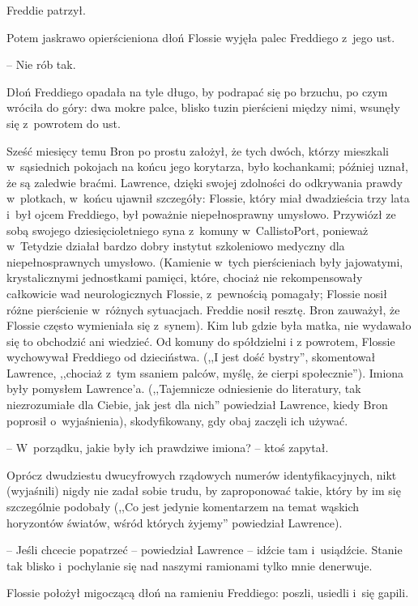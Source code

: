 \documentclass[oneside,polish,11pt,rmheadings]{mwbk}
\begin{document}
Freddie patrzył. 

Potem jaskrawo opierścieniona dłoń Flossie wyjęła palec Freddiego z~jego ust.  

-- Nie rób tak. 

Dłoń Freddiego opadała na tyle długo, by podrapać się po brzuchu, po czym wróciła do góry: dwa mokre palce, blisko tuzin pierścieni między nimi, wsunęły się z~powrotem do ust. 

Sześć miesięcy temu Bron po prostu założył, że tych dwóch, którzy mieszkali w~sąsiednich pokojach na końcu jego korytarza, było kochankami; później uznał, że są zaledwie braćmi. Lawrence, dzięki swojej zdolności do odkrywania prawdy w~plotkach, w~końcu ujawnił szczegóły: Flossie, który miał dwadzieścia trzy lata i~był ojcem Freddiego, był poważnie niepełnosprawny umysłowo. Przywiózł ze sobą swojego dziesięcioletniego syna z~komuny w~Callisto\dywiz Port, ponieważ w~Tetydzie działał bardzo dobry instytut szkoleniowo \dywiz medyczny dla niepełnosprawnych umysłowo. (Kamienie w~tych pierścieniach były jajowatymi, krystalicznymi jednostkami pamięci, które, chociaż nie rekompensowały całkowicie wad neurologicznych Flossie, z~pewnością pomagały; Flossie nosił różne pierścienie w~różnych sytuacjach. Freddie nosił resztę. Bron zauważył, że Flossie często wymieniała się z~synem). Kim lub gdzie była matka, nie wydawało się to obchodzić ani wiedzieć. Od komuny do spółdzielni i z powrotem, Flossie wychowywał Freddiego od dzieciństwa. (,,I jest dość bystry'', skomentował Lawrence, ,,chociaż z~tym ssaniem palców, myślę, że cierpi społecznie''). Imiona były pomysłem Lawrence'a. (,,Tajemnicze odniesienie do literatury, tak niezrozumiałe dla Ciebie, jak jest dla nich'' powiedział Lawrence, kiedy Bron poprosił o~wyjaśnienia), skodyfikowany, gdy obaj zaczęli ich używać. 

-- W~porządku, jakie były ich prawdziwe imiona? --  ktoś zapytał.

 Oprócz dwudziestu dwucyfrowych rządowych numerów identyfikacyjnych, nikt (wyjaśnili) nigdy nie zadał sobie trudu, by zaproponować takie, który by im się szczególnie podobały (,,Co  jest jedynie komentarzem na temat wąskich horyzontów światów, wśród których żyjemy'' powiedział Lawrence). 

-- Jeśli chcecie popatrzeć -- powiedział Lawrence -- idźcie tam i~usiądźcie. Stanie tak blisko i~pochylanie się nad naszymi ramionami tylko mnie denerwuje. 

Flossie położył migoczącą dłoń na ramieniu Freddiego: poszli, usiedli i~się gapili. 
\end{document}
